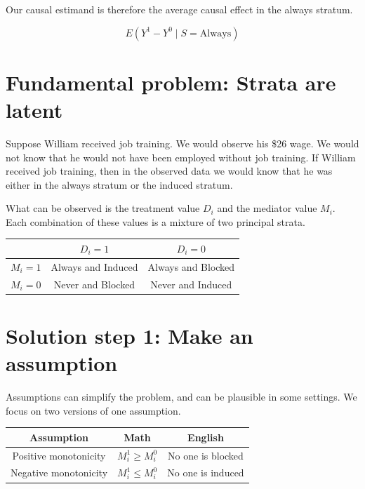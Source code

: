 \documentclass[
]{book}
\begin{document}
Our causal estimand is therefore the average causal effect in the always stratum.

\[E(Y^1 - Y^0 \mid S = \text{Always})\]

\hypertarget{fundamental-problem-strata-are-latent}{%
\section{Fundamental problem: Strata are latent}\label{fundamental-problem-strata-are-latent}}

Suppose William received job training. We would observe his \$26 wage. We would not know that he would not have been employed without job training. If William received job training, then in the observed data we would know that he was either in the always stratum or the induced stratum.

What can be observed is the treatment value \(D_i\) and the mediator value \(M_i\). Each combination of these values is a mixture of two principal strata.

\begin{longtable}[]{@{}ccc@{}}
\toprule\noalign{}
& \(D_i = 1\) & \(D_i = 0\) \\
\midrule\noalign{}
\endhead
\bottomrule\noalign{}
\endlastfoot
\(M_i = 1\) & Always and Induced & Always and Blocked \\
\(M_i = 0\) & Never and Blocked & Never and Induced \\
\end{longtable}

\hypertarget{solution-step-1-make-an-assumption}{%
\section{Solution step 1: Make an assumption}\label{solution-step-1-make-an-assumption}}

Assumptions can simplify the problem, and can be plausible in some settings. We focus on two versions of one assumption.

\begin{longtable}[]{@{}ccc@{}}
\toprule\noalign{}
Assumption & Math & English \\
\midrule\noalign{}
\endhead
\bottomrule\noalign{}
\endlastfoot
Positive monotonicity & \(M_i^1 \geq M_i^0\) & No one is blocked \\
Negative monotonicity & \(M_i^1\leq M_i^0\) & No one is induced \\
\end{longtable}
\end{document}
